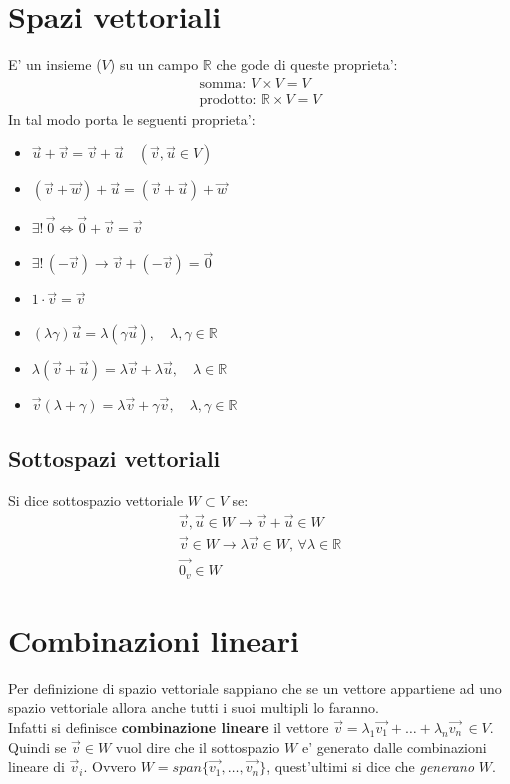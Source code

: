 \documentclass[10pt]{extarticle}
\begin{document}
\section{Spazi vettoriali}
E' un insieme ($V$) su un campo $\mathbb{R}$ che gode di queste proprieta': 
\begin{align*}
    \text{somma}: \, V \times V = V \\
    \text{prodotto}: \, \mathbb{R} \times V = V
\end{align*} 
In tal modo porta le seguenti proprieta':
\begin{itemize}
    \item $\vec{u}+\vec{v}=\vec{v}+\vec{u} \quad (\vec{v},\vec{u} \in V)$
    \item $(\vec{v}+\vec{w})+\vec{u}=(\vec{v}+\vec{u})+\vec{w}$
    \item $\exists! \,\vec{0} \iff \vec{0} + \vec{v} = \vec{v}$
    \item $\exists! \, (-\vec{v}) \to \vec{v}+(-\vec{v})=\vec{0}$
    \item $1 \cdot \vec{v}=\vec{v}$
    \item $(\lambda \gamma)\vec{u}=\lambda(\gamma \vec{u}), \quad \lambda,\gamma \in \mathbb{R}$
    \item $\lambda(\vec{v}+\vec{u})=\lambda\vec{v}+\lambda\vec{u}, \quad \lambda \in \mathbb{R}$
    \item $\vec{v}(\lambda+\gamma)=\lambda\vec{v}+\gamma\vec{v}, \quad \lambda,\gamma \in \mathbb{R}$
\end{itemize}
\subsection{Sottospazi vettoriali}
Si dice sottospazio vettoriale $W \subset V$ se:
\begin{align*}
    \vec{v},\vec{u} \in W \to \vec{v}+\vec{u}\in W \\
    \vec{v}\in W \to \lambda\vec{v}\in W, \, \forall \lambda \in \mathbb{R} \\
    \vec{0_v} \in W
\end{align*}

\section{Combinazioni lineari}
Per definizione di spazio vettoriale sappiano che se un vettore appartiene ad uno spazio vettoriale allora anche tutti i suoi multipli lo faranno. \\
Infatti si definisce \textbf{combinazione lineare} il vettore $\vec{v}=\lambda_1 \vec{v_1}+\dots+\lambda_n \vec{v_n} \, \in V$. \\
Quindi se $\vec{v} \in W$ vuol dire che il sottospazio $W$ e' generato dalle combinazioni lineare di $\vec{v}_i$. Ovvero $W=span\{\vec{v_1},\dots,\vec{v_n}\}$, quest'ultimi si dice che \textit{generano} $W$. \\
\end{document}
